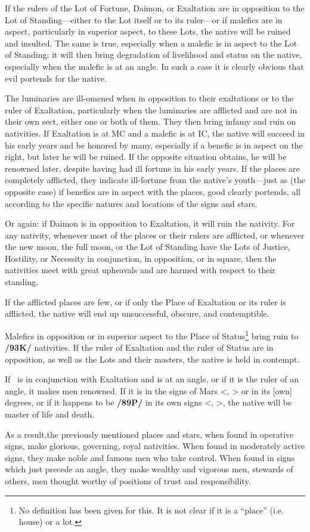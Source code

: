 If the rulers of the Lot of Fortune, Daimon, or Exaltation are in opposition to the Lot of Standing—either to the Lot itself or to its ruler—or if malefics are in aspect, particularly in superior aspect, to these Lots, the native will be ruined and insulted. The same is true, especially when a malefic is in
aspect to the Lot of Standing: it will then bring degradation of livelihood and status on the native, especially when the malefic is at an angle. In such a case it is clearly obvious that evil portends for the native.

The luminaries are ill-omened when in opposition to their exaltations or to the ruler of Exaltation, particularly when the luminaries are afflicted and are not in their own sect, either one or both of them. They then bring infamy and ruin on nativities. If Exaltation is at MC and a malefic is at IC, the native will succeed in his early years and be honored by many, especially if a benefic is in aspect on the right, but later he will be ruined. If the opposite situation obtains, he will be renowned later, despite having had ill fortune in his early years. If the places are completely afflicted, they indicate ill-fortune from the native’s youth—just as (the opposite case) if benefics are in aspect with the places, good clearly portends, all according to the specific natures and locations of the signs and stars.

Or again: if Daimon is in opposition to Exaltation, it will ruin the nativity. For any nativity, whenever most of the places or their rulers are afflicted, or whenever the new moon, the full moon, or the Lot of Standing have the Lots of Justice, Hostility, or Necessity in conjunction, in opposition, or in
square, then the nativities meet with great upheavals and are harmed with respect to their standing. 

If the afflicted places are few, or if only the Place of Exaltation or its ruler is afflicted, the native will end up unsuccessful, obscure, and contemptible. 

Malefics in opposition or in superior aspect to the Place of Status\footnote{No definition has been given for this. It is not clear if it is a ``place'' (i.e. house) or a lot.} bring ruin to \textbf{/93K/} nativities. If the ruler of Exaltation and the ruler of Status are in opposition, as well as the Lots and their masters, the native is held in contempt. 

If \Jupiter\, is in conjunction with Exaltation and
is at an angle, or if it is the ruler of an angle, it makes men renowned. If it is in the signs of Mars <\Scorpio, \Aries> or in its [own] degrees, or if it happens to be \textbf{/89P/} in its own signs <\Sagittarius, \Pisces>, the native will be master of life and death.

As a result,\mndl the previously mentioned places and stars, when found in operative signs, make glorious, governing, royal nativities. When found in moderately active signs, they make noble and famous men who take control. When found in signs which just precede an angle, they make wealthy and vigorous men, stewards of others, men thought worthy of positions of trust and responsibility.

\newpage
